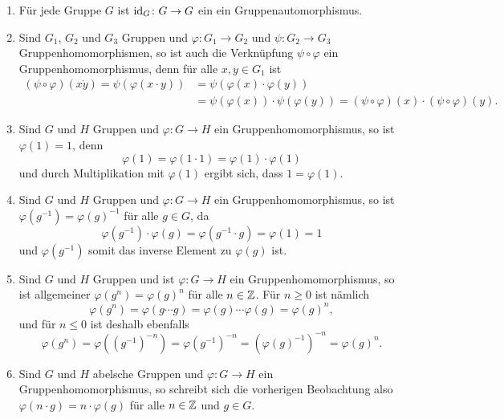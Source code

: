 \begin{bem}
 \begin{enumerate}[leftmargin=*]
  \item
   Für jede Gruppe $G$ ist $\mathrm{id}_G \colon G \to G$ ein ein Gruppenautomorphismus.
  \item
   Sind $G_1$, $G_2$ und $G_3$ Gruppen und $\varphi \colon G_1 \to G_2$ und $\psi \colon G_2 \to G_3$ Gruppenhomomorphismen, so ist auch die Verknüpfung $\psi \circ \varphi$ ein Gruppenhomomorphismus, denn für alle $x,y \in G_1$ ist
   \begin{align*}
    (\psi \circ \varphi)(x \dot y)
    = \psi(\varphi(x \cdot y))
    &= \psi(\varphi(x) \cdot \varphi(y)) \\
    &= \psi(\varphi(x)) \cdot \psi(\varphi(y))
    = (\psi \circ \varphi)(x) \cdot (\psi \circ \varphi)(y).
   \end{align*}
  \item
   Sind $G$ und $H$ Gruppen und $\varphi \colon G \to H$ ein Gruppenhomomorphismus, so ist $\varphi(1) = 1$, denn
   \[
    \varphi(1)
    = \varphi(1 \cdot 1)
    = \varphi(1) \cdot \varphi(1)
   \]
   und durch Multiplikation mit $\varphi(1)$ ergibt sich, dass $1 = \varphi(1)$.
  \item
   Sind $G$ und $H$ Gruppen und $\varphi \colon G \to H$ ein Gruppenhomomorphismus, so ist $\varphi(g^{-1}) = \varphi(g)^{-1}$ für alle $g \in G$, da
   \[
    \varphi(g^{-1}) \cdot \varphi(g)
    = \varphi(g^{-1} \cdot g)
    = \varphi(1)
    = 1
   \]
   und $\varphi(g^{-1})$ somit das inverse Element zu $\varphi(g)$ ist.
  \item
   Sind $G$ und $H$ Gruppen und ist $\varphi \colon G \to H$ ein Gruppenhomomorphismus, so ist allgemeiner $\varphi(g^n) = \varphi(g)^n$ für alle $n \in \mathbb{Z}$. Für $n \geq 0$ ist nämlich
   \[
    \varphi(g^n)
    = \varphi(g \dotsm g)
    = \varphi(g) \dotsm \varphi(g)
    = \varphi(g)^n,
   \]
   und für $n \leq 0$ ist deshalb ebenfalls
   \[
    \varphi(g^n)
    = \varphi\left( \left(g^{-1}\right)^{-n} \right)
    = \varphi\left( g^{-1} \right)^{-n}
    = \left( \varphi(g)^{-1} \right)^{-n}
    = \varphi(g)^n.
   \]
   
  \item
   Sind $G$ und $H$ abelsche Gruppen und $\varphi \colon G \to H$ ein Gruppenhomomorphismus, so schreibt sich die vorherigen Beobachtung also $\varphi(n \cdot g) = n \cdot \varphi(g)$ für alle $n \in \mathbb{Z}$ und $g \in G$.


\end{enumerate}
\end{bem}
